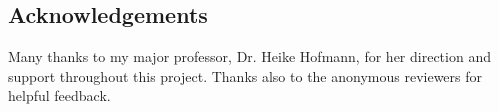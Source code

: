 \begin{article}
\section{Acknowledgements}

Many thanks to my major professor, Dr. Heike Hofmann, for her direction
and support throughout this project. Thanks also to the anonymous
reviewers for helpful feedback.







\address{Carson Sievert\\
Department of Statistics\\
Iowa State University}\\

\end{article}
%
